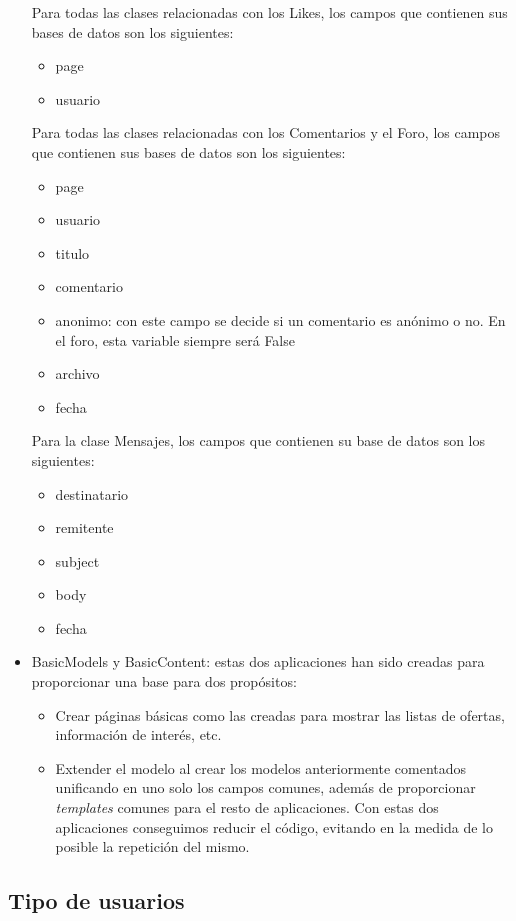 \begin{itemize}
Para todas las clases relacionadas con los Likes, los campos que contienen sus bases de datos son los siguientes:
	\begin{itemize}
		\item page
		\item usuario
	\end{itemize}

Para todas las clases relacionadas con los Comentarios y el Foro, los campos que contienen sus bases de datos son los siguientes:
	\begin{itemize}
		\item page
		\item usuario
		\item titulo
		\item comentario
		\item anonimo: con este campo se decide si un comentario es anónimo o no. En el foro, esta variable siempre será False
		\item archivo
		\item fecha
	\end{itemize}

Para la clase Mensajes, los campos que contienen su base de datos son los siguientes:
\begin{itemize}
		\item destinatario
		\item remitente
		\item subject
		\item body
		\item fecha
	\end{itemize}    
    
\item BasicModels y BasicContent: estas dos aplicaciones han sido creadas para proporcionar una base para dos propósitos:
\begin{itemize}
\item Crear páginas básicas como las creadas para mostrar las listas de ofertas, información de interés, etc.
\item Extender el modelo al crear los modelos anteriormente comentados unificando en uno solo los campos comunes, además de proporcionar \textit{templates} comunes para el resto de aplicaciones.
Con estas dos aplicaciones conseguimos reducir el código, evitando en la medida de lo posible la repetición del mismo.
\end{itemize}
\end{itemize}


\subsection{Tipo de usuarios} 
\label{subsec:usuarios}


